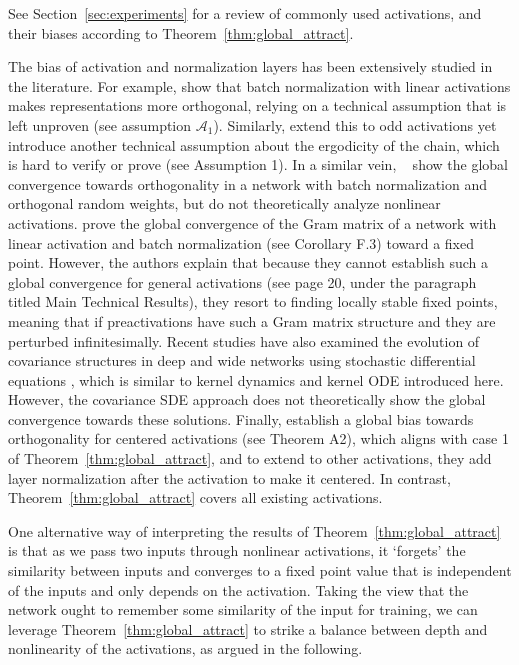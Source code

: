 \documentclass[twoside]{article}
\theoremstyle{definition}
\begin{document}
See Section~\ref{sec:experiments} for a review of commonly used activations, and their biases according to Theorem~\ref{thm:global_attract}.

The bias of activation and normalization layers has been extensively studied in the literature. For example, \citet{daneshmand2021batch} show that batch normalization with linear activations makes representations more orthogonal, relying on a technical assumption that is left unproven (see assumption $\mathcal{A}_1$). Similarly, \citet{joudaki2023bridging} extend this to odd activations yet introduce another technical assumption about the ergodicity of the chain, which is hard to verify or prove (see Assumption 1). In a similar vein, ~\citet{meterez2024towards} show the global convergence towards orthogonality in a network with batch normalization and orthogonal random weights, but do not theoretically analyze nonlinear activations. \citet{yang2019meanfield} prove the global convergence of the Gram matrix of a network with linear activation and batch normalization (see Corollary F.3) toward a fixed point. However, the authors explain that because they cannot establish such a global convergence for general activations (see page 20, under the paragraph titled Main Technical Results), they resort to finding locally stable fixed points, meaning that if preactivations have such a Gram matrix structure and they are perturbed infinitesimally. Recent studies have also examined the evolution of covariance structures in deep and wide networks using stochastic differential equations \citep{li2022neural}, which is similar to kernel dynamics and kernel ODE introduced here. However, the covariance SDE approach does not theoretically show the global convergence towards these solutions. Finally, \citet{joudaki2023impact} establish a global bias towards orthogonality for centered activations (see Theorem A2), which aligns with case 1 of Theorem~\ref{thm:global_attract}, and to extend to other activations, they add layer normalization after the activation to make it centered. In contrast, Theorem~\ref{thm:global_attract} covers all existing activations. 

One alternative way of interpreting the results of Theorem~\ref{thm:global_attract} is that as we pass two inputs through nonlinear activations, it `forgets' the similarity between inputs and converges to a fixed point value that is independent of the inputs and only depends on the activation. Taking the view that the network ought to remember some similarity of the input for training, we can leverage Theorem~\ref{thm:global_attract} to strike a balance between depth and nonlinearity of the activations, as argued in the following.
\end{document}
